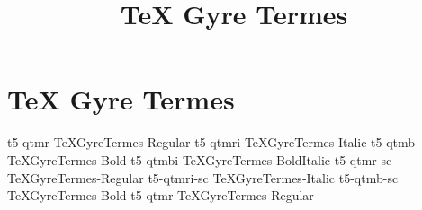 \documentclass[sample]{vnsample}
\title{TeX Gyre Termes}
\begin{document}
\section{TeX Gyre Termes}
    {t5-qtmr}     {TeXGyreTermes-Regular}
   {t5-qtmri}    {TeXGyreTermes-Italic}
    {t5-qtmb}     {TeXGyreTermes-Bold}
   {t5-qtmbi}    {TeXGyreTermes-BoldItalic}
   {t5-qtmr-sc}  {TeXGyreTermes-Regular}
 {t5-qtmri-sc} {TeXGyreTermes-Italic}
   {t5-qtmb-sc}  {TeXGyreTermes-Bold}
    {t5-qtmr}     {TeXGyreTermes-Regular}
\end{document}
